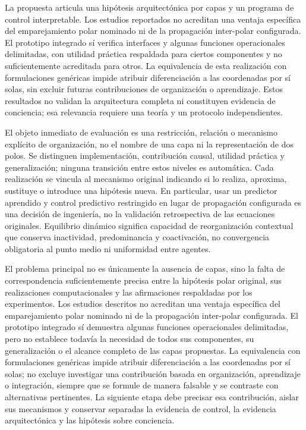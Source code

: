 
La propuesta articula una hipótesis arquitectónica por capas y un programa de control interpretable. Los estudios reportados no acreditan una ventaja específica del emparejamiento polar nominado ni de la propagación inter-polar configurada. El prototipo integrado sí verifica interfaces y algunas funciones operacionales delimitadas, con utilidad práctica respaldada para ciertos componentes y no suficientemente acreditada para otros. La equivalencia de esta realización con formulaciones genéricas impide atribuir diferenciación a las coordenadas por sí solas, sin excluir futuras contribuciones de organización o aprendizaje. Estos resultados no validan la arquitectura completa ni constituyen evidencia de conciencia; esa relevancia requiere una teoría y un protocolo independientes.

El objeto inmediato de evaluación es una restricción, relación o mecanismo explícito de organización, no el nombre de una capa ni la representación de dos polos. Se distinguen implementación, contribución causal, utilidad práctica y generalización; ninguna transición entre estos niveles es automática. Cada realización se vincula al mecanismo original indicando si lo realiza, aproxima, sustituye o introduce una hipótesis nueva. En particular, usar un predictor aprendido y control predictivo restringido en lugar de propagación configurada es una decisión de ingeniería, no la validación retrospectiva de las ecuaciones originales. Equilibrio dinámico significa capacidad de reorganización contextual que conserva inactividad, predominancia y coactivación, no convergencia obligatoria al punto medio ni uniformidad entre agentes.

El problema principal no es únicamente la ausencia de capas, sino la falta de correspondencia suficientemente precisa entre la hipótesis polar original, sus realizaciones computacionales y las afirmaciones respaldadas por los experimentos. Los estudios descritos no acreditan una ventaja específica del emparejamiento polar nominado ni de la propagación inter-polar configurada. El prototipo integrado sí demuestra algunas funciones operacionales delimitadas, pero no establece todavía la necesidad de todos sus componentes, su generalización o el alcance completo de las capas propuestas. La equivalencia con formulaciones genéricas impide atribuir diferenciación a las coordenadas por sí solas; no excluye investigar una contribución basada en organización, aprendizaje o integración, siempre que se formule de manera falsable y se contraste con alternativas pertinentes. La siguiente etapa debe precisar esa contribución, aislar sus mecanismos y conservar separadas la evidencia de control, la evidencia arquitectónica y las hipótesis sobre conciencia.
